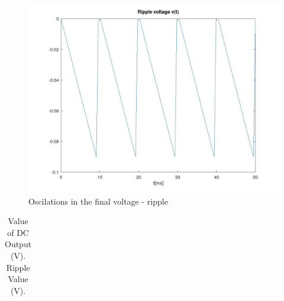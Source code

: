\begin{figure}[h] 
    \centering
    \includegraphics[width=0.75\linewidth]{../mat/vripple.jpg}
    \caption{Oscilations in the final voltage - ripple}
    \label{fig:Ripple}
\end{figure}

\vspace{4mm}
\begin{table}[ht]
    \centering
    \begin{tabular}{|c|c|}
        \hline
      
    \end{tabular}
    \vspace{10mm}
    \caption{Value of DC Output (V). Ripple Value (V).}
    \label{tab:teovalues}
  \end{table}

\newpage
